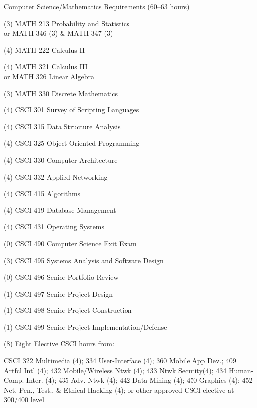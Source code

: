 \begin{reqgroup}{Computer Science/Mathematics Requirements (60--63 hours)}
\begin{checklist}
\begin{minipage}[t]{0.5\linewidth}
	\item (3) MATH 213 Probability and Statistics\\or MATH 346 (3) \& MATH 347 (3)
	\item (4) MATH 222 Calculus II
	\item (4) MATH 321 Calculus III\\or MATH 326 Linear Algebra
	\item (3) MATH 330 Discrete Mathematics

	\item (4) CSCI 301 Survey of Scripting Languages
	\item (4) CSCI 315 Data Structure Analysis
	\item (4) CSCI 325 Object-Oriented Programming
	\item (4) CSCI 330 Computer Architecture
	\item (4) CSCI 332 Applied Networking
	\item (4) CSCI 415 Algorithms
	\item (4) CSCI 419 Database Management


\end{minipage}
\begin{minipage}[t]{0.5\linewidth}
	\item (4) CSCI 431 Operating Systems
	\item (0) CSCI 490 Computer Science Exit Exam
	\item (3) CSCI 495 Systems Analysis and Software Design
	\item (0) CSCI 496 Senior Portfolio Review
	\item (1) CSCI 497 Senior Project Design
	\item (1) CSCI 498 Senior Project Construction
	\item (1) CSCI 499 Senior Project Implementation/Defense

	\item (8) Eight Elective CSCI hours from:
	\item \hspace{1em}\begin{minipage}[t]{\dimexpr\linewidth-1em\relax}CSCI 322 Multimedia (4); 334 User-Interface (4); 360 Mobile App Dev.; 409 Artfcl Intl (4); 432 Mobile/Wireless Ntwk (4); 433 Ntwk Security(4); 434 Human-Comp. Inter. (4); 435 Adv. Ntwk (4); 442 Data Mining (4); 450 Graphics (4); 452 Net. Pen., Test., \& Ethical Hacking (4); or other approved CSCI elective at 300/400 level\end{minipage}


\end{minipage}
\end{checklist}
\end{reqgroup}

